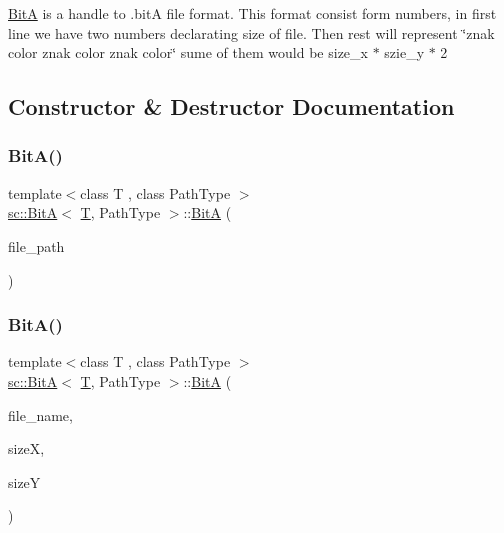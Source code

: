 \mbox{\hyperlink{classsc_1_1_bit_a}{BitA}} is a handle to .bitA file format. This format consist form numbers, in first line we have two numbers declarating size of file. Then rest will represent \char`\"{}znak color znak color znak color\char`\"{} sume of them would be size\+\_\+x $\ast$ szie\+\_\+y $\ast$ 2 

\subsection{Constructor \& Destructor Documentation}
\mbox{\label{classsc_1_1_bit_a_ae6186444c3c4d4150007ac242691488d}} 
\subsubsection{\texorpdfstring{BitA()}{BitA()}\hspace{0.1cm}{\footnotesize\ttfamily [1/2]}}
{\footnotesize\ttfamily template$<$class T , class Path\+Type $>$ \\
\mbox{\hyperlink{classsc_1_1_bit_a}{sc\+::\+BitA}}$<$ \mbox{\hyperlink{_keyboard_event_8h_adf1f3edb9115acb0a1e04209b7a9937b}{T}}, Path\+Type $>$\+::\mbox{\hyperlink{classsc_1_1_bit_a}{BitA}} (\begin{DoxyParamCaption}\item[{Path\+Type}]{file\+\_\+path }\end{DoxyParamCaption})}

\mbox{\label{classsc_1_1_bit_a_a33f4ad31b4fb529eb91352b9573ebd8a}} 
\subsubsection{\texorpdfstring{BitA()}{BitA()}\hspace{0.1cm}{\footnotesize\ttfamily [2/2]}}
{\footnotesize\ttfamily template$<$class T , class Path\+Type $>$ \\
\mbox{\hyperlink{classsc_1_1_bit_a}{sc\+::\+BitA}}$<$ \mbox{\hyperlink{_keyboard_event_8h_adf1f3edb9115acb0a1e04209b7a9937b}{T}}, Path\+Type $>$\+::\mbox{\hyperlink{classsc_1_1_bit_a}{BitA}} (\begin{DoxyParamCaption}\item[{Path\+Type}]{file\+\_\+name,  }\item[{unsigned int}]{sizeX,  }\item[{unsigned int}]{sizeY }\end{DoxyParamCaption})}

